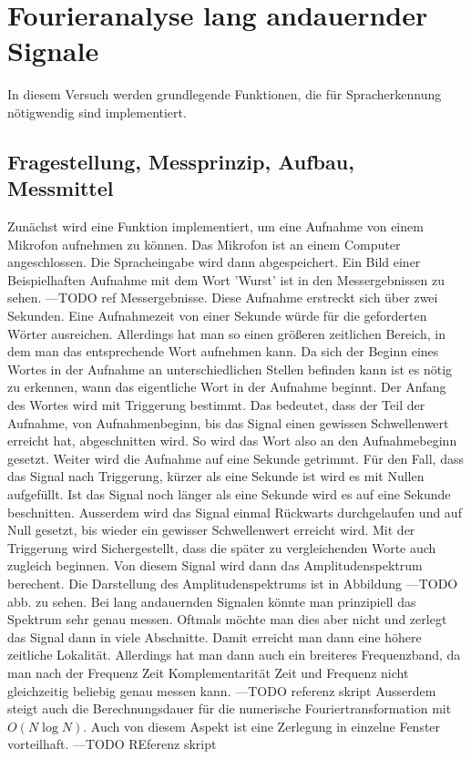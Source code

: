 %
%
\chapter{Fourieranalyse lang andauernder Signale}
\label{chap:VERSUCH_1}
In diesem Versuch werden grundlegende Funktionen, die für Spracherkennung nötigwendig sind implementiert.
\section{Fragestellung, Messprinzip, Aufbau, Messmittel}
\label{chap:VERSUCH_1_FRAGESTELLUNG}
Zunächst wird eine Funktion implementiert, um eine Aufnahme von einem Mikrofon aufnehmen zu können. Das Mikrofon ist an einem Computer angeschlossen. Die Spracheingabe wird dann abgespeichert.
Ein Bild einer Beispielhaften Aufnahme mit dem Wort 'Wurst' ist in den Messergebnissen zu sehen. ---TODO ref Messergebnisse.
Diese Aufnahme erstreckt sich über zwei Sekunden. Eine Aufnahmezeit von einer Sekunde würde für die geforderten Wörter ausreichen. Allerdings hat man so einen größeren zeitlichen Bereich, in dem man das entsprechende Wort aufnehmen kann.
Da sich der Beginn eines Wortes in der Aufnahme an unterschiedlichen Stellen befinden kann ist es nötig zu erkennen, wann das eigentliche Wort in der Aufnahme beginnt. Der Anfang des Wortes wird mit Triggerung bestimmt. Das bedeutet, dass der Teil der Aufnahme, von Aufnahmenbeginn, bis das Signal einen gewissen Schwellenwert erreicht hat, abgeschnitten wird. So wird das Wort also an den Aufnahmebeginn gesetzt. Weiter wird die Aufnahme auf eine Sekunde getrimmt. Für den Fall, dass das Signal nach Triggerung, kürzer als eine Sekunde ist wird es mit Nullen aufgefüllt.
Ist das Signal noch länger als eine Sekunde wird es auf eine Sekunde beschnitten. Ausserdem wird das Signal einmal Rückwarts durchgelaufen und auf Null gesetzt, bis wieder ein gewisser Schwellenwert erreicht wird.
Mit der Triggerung wird Sichergestellt, dass die später zu vergleichenden Worte auch zugleich beginnen.
Von diesem Signal wird dann das Amplitudenspektrum berechent. Die Darstellung des Amplitudenspektrums ist in Abbildung ---TODO abb. zu sehen.
Bei lang andauernden Signalen könnte man prinzipiell das Spektrum sehr genau messen. Oftmals möchte man dies aber nicht und zerlegt das Signal dann in viele Abschnitte. Damit erreicht man dann eine höhere zeitliche Lokalität. Allerdings hat man dann auch ein breiteres Frequenzband, da man nach der Frequenz Zeit Komplementarität Zeit und Frequenz nicht gleichzeitig beliebig genau messen kann. ---TODO referenz skript Ausserdem steigt auch die Berechnungsdauer für die numerische Fouriertransformation mit $O(N \log N)$. Auch von diesem Aspekt ist eine Zerlegung in einzelne Fenster vorteilhaft. ---TODO REferenz skript
